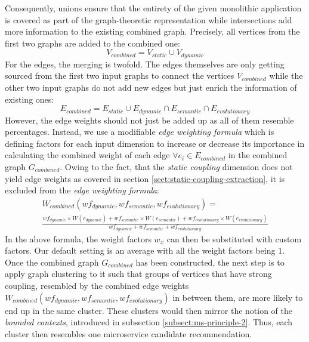\documentclass[12pt,a4paper]{report}
\begin{document}
Consequently, unions ensure that the entirety of the given
monolithic application is covered as part of the graph-theoretic representation
while intersections add more information to the existing combined graph.
Precisely, all vertices from the first two graphs are added to the combined one:
\[
  V_{combined} = V_{static} \cup V_{dynamic}
\]
For the edges, the merging is twofold. The edges themselves are only getting
sourced from the first two input graphs to connect the vertices \(V_{combined}\)
while the other two input graphs do not add new edges but just enrich the
information of existing ones:
\[
  E_{combined} = E_{static} \cup E_{dynamic} \cap E_{semantic} \cap E_{evolutionary}
\]
However, the edge weights should not just be added up as all of them resemble
percentages. Instead, we use a modifiable \textit{edge weighting formula} which
is defining factors for each input dimension to increase or decrease its importance
in calculating the combined weight of each edge \(\forall e_i \in E_{combined}\)
in the combined graph \(G_{combined}\). Owing to the fact, that the
\textit{static coupling} dimension does not yield edge weights as covered in
section \ref{sect:static-coupling-extraction}, it is excluded from
the \textit{edge weighting formula}:
\small
\begin{equation*}
\begin{split}
  W_{combined}(wf_{dynamic}, wf_{semantic}, wf_{evolutionary}) = \\
  \frac{
    wf_{dynamic} \times W(e_{dynamic}) +
    wf_{semantic} \times W(e_{semantic}) +
    wf_{evolutionary} \times W(e_{evolutionary})
  }{
    wf_{dynamic} +
    wf_{semantic} +
    wf_{evolutionary}
  }
\end{split}
\end{equation*}
\normalsize
In the above formula, the weight factors \(w_x\) can then be substituted
with custom factors. Our default setting is an average with all the
weight factors being \(1\).
\newline
Once the combined graph \(G_{combined}\) has been constructed, the next step is
to apply graph clustering to it such that groups of vertices that have strong
coupling, resembled by the combined edge weights
\(W_{combined}(wf_{dynamic}, wf_{semantic}, wf_{evolutionary})\) in between them,
are more likely to end up in the same cluster.
These clusters would then mirror the notion of the \textit{bounded contexts},
introduced in subsection \ref{subsect:ms-principle-2}.
Thus, each cluster then resembles one microservice candidate recommendation.
\end{document}
